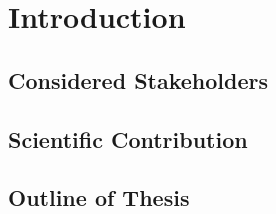 \chapter{Introduction}\label{chap:introduction}

\section{Considered Stakeholders}
\section{Scientific Contribution}
\section{Outline of Thesis}